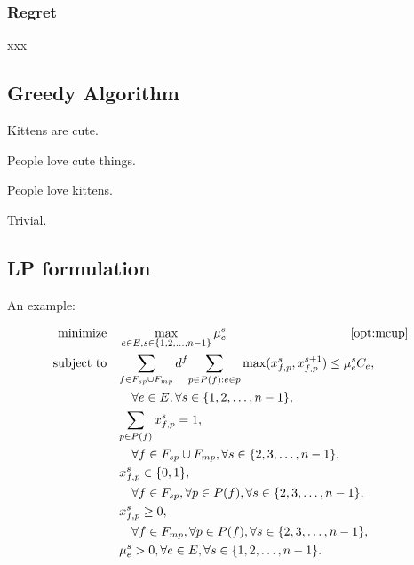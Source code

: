 \subsubsection{Regret}
xxx

\subsection{Greedy Algorithm}



\begin{property}
Kittens are cute.
\end{property}

\begin{lemma}
People love cute things.
\end{lemma}

\begin{theorem}\label{theorem:TheFatTreeInApx}
People love kittens.
\end{theorem}

\begin{IEEEproof}
Trivial.
\end{IEEEproof}

\subsection{LP formulation}
An example:

\begin{subequations}\label{opt:mcup}
\begin{align}
\text{minimize} & \quad\max_{e \in E,s \in \{1, 2, \dots, n-1 \}} \mu_e^s \quad\quad\quad\quad\quad\quad\quad\quad\quad\quad\eqref{opt:mcup}\notag\\
\text{subject to} & \quad {\sum_{f \in F_{sp} \cup F_{mp}} d^f {\sum_{p \in P(f): e\in p} \max(x_{f,p}^s},x_{f,p}^{s+1})}
\leq \mu_e^s C_{e}, \notag \\
& \quad\quad\forall e \in E, \forall s \in \{1, 2, \dots, n-1 \}, \label{equ:CapacityConstraint}\\
& \quad{\sum_{p \in P(f)} x_{f,p}^s} = 1, \notag \\
& \quad\quad\forall f \in F_{sp} \cup F_{mp}, \forall s \in \{2, 3, \dots, n-1 \}, \label{equ:SumConstraint}\\
& \quad x_{f,p}^s \in \{0,1\}, \notag \\
& \quad\quad\forall f \in F_{sp}, \forall p \in P(f), \forall s \in \{2, 3, \dots, n-1 \}, \label{equ:SinglePath}\\
& \quad x_{f,p}^s \geq 0, \notag \\
& \quad\quad\forall f \in F_{mp}, \forall p \in P(f), \forall s \in \{2, 3, \dots, n-1 \},
\label{equ:Multipath}\\
& \quad\mu_e^s > 0, \forall e \in E, \forall s \in \{1, 2, \dots, n-1 \}. \label{equ:ObjPositiveCostraint}
\end{align}
\end{subequations}
